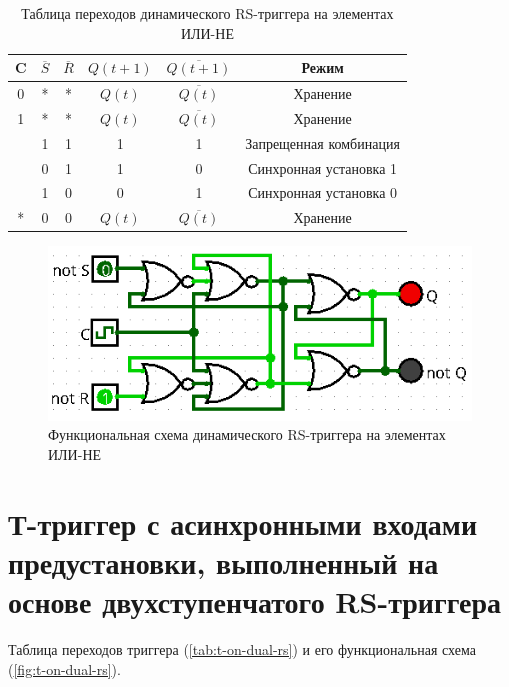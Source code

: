 \documentclass[14pt, a4paper]{extreport}
\newcommand\clocktb{%
	\begin{tikzpicture}[scale=0.25pt]
		\draw (0,1) -- (1,1) -- (1,0) -- (2,0);
	\end{tikzpicture}%
}
\begin{document}
\begin{table}[H]
	\caption{Таблица переходов динамического RS-триггера на элементах ИЛИ-НЕ}
	\label{tab:dynamic-rs-nor}
	\begin{tabular}{|c|c|c|c|c|c|}
		\hline
		C & $\overline{S}$ & $\overline{R}$ & $Q(t + 1)$ & $\overline{Q(t + 1)}$ & Режим \\
		\hline
		0 & * & * & $Q(t)$ & $\overline{Q(t)}$ & Хранение \\
		\hline
		1 & * & * & $Q(t)$ & $\overline{Q(t)}$ & Хранение \\
		\hline
		\clocktb & 1 & 1 & 1 & 1 & Запрещенная комбинация \\
		\hline
		\clocktb & 0 & 1 & 1 & 0 & Синхронная установка 1 \\
		\hline
		\clocktb & 1 & 0 & 0 & 1 & Синхронная установка 0 \\
		\hline
		* & 0 & 0 & $Q(t)$ & $\overline{Q(t)}$ & Хранение \\
		\hline
	\end{tabular}
\end{table}

\begin{figure}[H]
	\caption{Функциональная схема динамического RS-триггера на элементах ИЛИ-НЕ}
	\label{fig:dynamic-rs-nor}
	\includegraphics[width=\textwidth]{dynamic-rs-nor}
\end{figure}

\section{Т-триггер с асинхронными входами предустановки, выполненный на основе двухступенчатого RS-триггера}
Таблица переходов триггера (\cref{tab:t-on-dual-rs}) и его функциональная схема (\cref{fig:t-on-dual-rs}).
\end{document}
